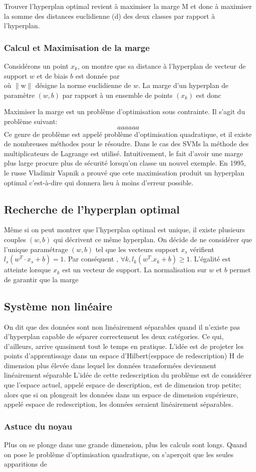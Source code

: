 Trouver l’hyperplan optimal revient à maximiser la marge M et donc à maximiser la
somme des distances euclidienne (d) des deux classes par rapport à l’hyperplan.
\subsubsection{Calcul et Maximisation de la marge}

Considérons  un point $x_k$, on montre que sa distance à l'hyperplan de vecteur
de support $w$ et de biais $b$ est donnée par 
$$
$$
où $\|$w$\|$ désigne la norme euclidienne de $w$. La marge d'un hyperplan de paramètre
$(w,b)$ par rapport à un ensemble de points $(x_k)$ est donc 


Maximiser la marge est un problème d'optimisation sous contrainte. Il s'agit du
problème suivant: 
$$
aaaaaa
$$
Ce genre de problème est appelé problème d’optimisation quadratique, et il
existe de nombreuses méthodes pour le résoudre. Dans le cas des SVMs la méthode
des multiplicateurs de Lagrange est utilisé.
Intuitivement, le fait d'avoir une marge plus large procure plus de sécurité lorsqu’on
classe un nouvel exemple. En 1995, le russe Vladimir Vapnik a prouvé que cete
maximisation produit un hyperplan optimal c'est-à-dire qui donnera lieu à
moins d'erreur possible.

\subsection{Recherche de l'hyperplan optimal}

Même si on peut montrer que l’hyperplan optimal est unique, il existe 
plusieurs couples $(w, b)$ qui décrivent ce même hyperplan. On décide de ne
considérer que l’unique paramétrage $(w, b)$ tel que les vecteurs support
$x_s$ vérifient $l_s (w^T \cdot x_s + b) = 1$. Par conséquent , 
$\forall k, l_k(w^T.x_k + b) \geq 1 $. L'égalité est atteinte lorsque $x_k$ est
un vecteur de support.
La normalisation sur $w$ et $b$ permet de garantir que la marge 

\subsection{Système non linéaire}

On dit que des données sont non linéairement séparables quand il n’existe pas 
d’hyperplan capable de séparer correctement les deux catégories. Ce qui, 
d’ailleurs, arrive quasiment tout le temps en pratique. L’idée est de projeter
les points d’apprentissage dans un espace d’Hilbert(esppace de redescription)
H de dimension plus élevée dans lequel les données transformées deviennent 
linéairement séparable
L’idée de cette redescription du problème est de considérer que l’espace 
actuel, appelé espace de description, est de dimension trop petite; alors que 
si on plongeait les données dans un espace de dimension supérieure, appelé 
espace de redescription, les données seraient linéairement séparables.

\subsubsection{Astuce du noyau}
 Plus on se plonge dans une grande dimension, plus les calculs sont longs. Quand
 on pose le problème d’optimisation quadratique, on s’aperçoit que les seules
 apparitions de  



